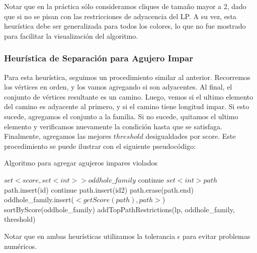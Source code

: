 Notar que en la práctica sólo consideramos cliques de tamaño mayor a 2, dado que si no se pisan con las restricciones de adyacencia del LP. A su vez, esta heurística debe ser generalizada para todos los colores, lo que no fue mostrado para facilitar la visualización del algoritmo.

\pagebreak

\subsubsection{Heurística de Separación para Agujero Impar}

Para esta heurística, seguimos un procedimiento similar al anterior. Recorremos los vértices en orden, y los vamos agregando si son adyacentes. Al final, el conjunto de vértices resultante es un camino. Luego, vemos si el ultimo elemento del camino es adyacente al primero, y si el camino tiene longitud impar. Si esto sucede, agregamos el conjunto a la familia. Si no sucede, quitamos el ultimo elemento y verificamos nuevamente la condición hasta que se satisfaga. Finalmente, agregamos las mejores $threshold$ desigualdades por score. Este procedimiento se puede ilustrar con el siguiente pseudocódigo:

\begin{algorithm}
\caption{Algoritmo para agregar agujeros impares violados}
\begin{algorithmic}[1]
\State $set<score, set<int>> oddhole\_family$
		\State continue
	\EndIf
	\State $set<int> path$
	\State path.insert(id)
			\State continue
		\EndIf
			\State path.insert(id2)
		\EndIf
	\EndFor
		\State path.erase(path.end)
	\EndWhile
		\State oddhole\_family.insert($<getScore(path), path>$)
	\EndIf
\EndFor
\State sortByScore(oddhole\_family)
\State addTopPathRestrictions(lp, oddhole\_family, threshold)

\EndProcedure
\end{algorithmic}
\end{algorithm}

Notar que en ambas heurísticas utilizamos la tolerancia $\epsilon$ para evitar problemas numéricos.

